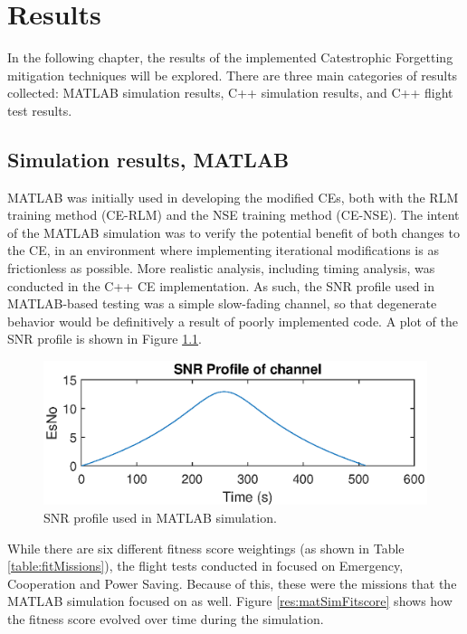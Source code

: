 \chapter{Results}\label{ch:results}

\par In the following chapter, the results of the implemented Catestrophic Forgetting mitigation techniques will be explored. There are three main categories of results collected: MATLAB simulation results, C++ simulation results, and C++ flight test results. %
\section{Simulation results, MATLAB}
\par MATLAB was initially used in developing the modified CEs, both with the RLM training method (CE-RLM) and the NSE training method (CE-NSE). The intent of the MATLAB simulation was to verify the potential benefit of both changes to the CE, in an environment where implementing iterational modifications is as frictionless as possible. More realistic analysis, including timing analysis, was conducted in the C++ CE implementation. As such, the SNR profile used in MATLAB-based testing was a simple slow-fading channel, so that degenerate behavior would be definitively a result of poorly implemented code. A plot of the SNR profile is shown in Figure \ref{fig:matlabSNRProf}. 
\begin{figure}[ht]
\centering
\includegraphics[scale=1]{figures/matlab_sim_results/snrPRofile_matlabsim.eps}
\caption{SNR profile used in MATLAB simulation.}
\label{fig:matlabSNRProf}
\end{figure}
\par While there are six different fitness score weightings (as shown in Table \ref{table:fitMissions}), the flight tests conducted in \cite{tim_implementation_paper} focused on Emergency, Cooperation and Power Saving. Because of this, these were the missions that the MATLAB simulation focused on as well. Figure \ref{res:matSimFitscore} shows how the fitness score evolved over time during the simulation.

